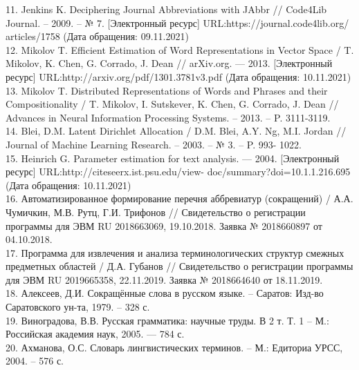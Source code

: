 \documentclass{article}
\begin{document}
11. Jenkins K. Deciphering Journal Abbreviations with JAbbr
// Code4Lib Journal. – 2009. – № 7. [Электронный ресурс]
URL:https://journal.code4lib.org/ articles/1758 (Дата обращения:
09.11.2021)\\
12. Mikolov T. Efficient Estimation of Word Representations in Vector
Space / T. Mikolov, K. Chen, G. Corrado, J. Dean // arXiv.org. — 2013.
[Электронный ресурс] URL:http://arxiv.org/pdf/1301.3781v3.pdf (Дата
обращения: 10.11.2021)\\
13. Mikolov T. Distributed Representations of Words and Phrases and
their Compositionality / T. Mikolov, I. Sutskever, K. Chen, G. Corrado, J.
Dean // Advances in Neural Information Processing Systems. – 2013. –
P. 3111-3119.\\
14. Blei, D.M. Latent Dirichlet Allocation / D.M. Blei, A.Y. Ng, M.I.
Jordan // Journal of Machine Learning Research. – 2003. – № 3. – P. 993-
1022.\\
15. Heinrich G. Parameter estimation for text analysis. —
2004. [Электронный ресурс] URL:http://citeseerx.ist.psu.edu/view-
doc/summary?doi=10.1.1.216.695 (Дата обращения: 10.11.2021)\\
16. Автоматизированное формирование перечня аббревиатур
(сокращений) / А.А. Чумичкин, М.В. Рутц, Г.И. Трифонов //
Свидетельство о регистрации программы для ЭВМ RU 2018663069,
19.10.2018. Заявка № 2018660897 от 04.10.2018.\\
17. Программа для извлечения и анализа терминологических
структур смежных предметных областей / Д.А. Губанов //
Свидетельство о регистрации программы для ЭВМ RU 2019665358,
22.11.2019. Заявка № 2018664640 от 18.11.2019.\\
18. Алексеев, Д.И. Сокращённые слова в русском языке. – Саратов:
Изд-во Саратовского ун-та, 1979. – 328 с.\\
19. Виноградова, В.В. Русская грамматика: научные труды. В 2 т. Т. 1
– М.: Российская академия наук, 2005. — 784 с.\\
20. Ахманова, О.С. Словарь лингвистических терминов. – М.:
Едиториа УРСС, 2004. – 576 с.
\end{document}
